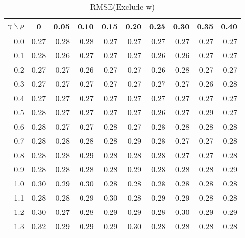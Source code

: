 \documentclass[12pt]{article}
\begin{document}
%

\begin{table}[!tbp]
\caption{RMSE(Exclude w)}
 \begin{center}
 \begin{tabular}{r|rrrrrrrrr}\hline\hline
\multicolumn{1}{c|}{$\gamma\backslash\rho$}&\multicolumn{1}{c}{0}&\multicolumn{1}{c}{0.05}&\multicolumn{1}{c}{0.10}&\multicolumn{1}{c}{0.15}&\multicolumn{1}{c}{0.20}&\multicolumn{1}{c}{0.25}&\multicolumn{1}{c}{0.30}&\multicolumn{1}{c}{0.35}&\multicolumn{1}{c}{0.40}\tabularnewline
\hline

0.0&0.27&0.28&0.28&0.27&0.27&0.27&0.27&0.27&0.27\tabularnewline
0.1&0.28&0.26&0.27&0.27&0.27&0.26&0.26&0.27&0.27\tabularnewline
0.2&0.27&0.27&0.26&0.27&0.27&0.26&0.28&0.27&0.27\tabularnewline
0.3&0.27&0.27&0.27&0.27&0.27&0.27&0.27&0.26&0.28\tabularnewline
0.4&0.27&0.27&0.27&0.27&0.27&0.27&0.27&0.27&0.27\tabularnewline
0.5&0.28&0.27&0.27&0.27&0.27&0.26&0.27&0.29&0.27\tabularnewline
0.6&0.28&0.27&0.27&0.28&0.27&0.28&0.28&0.28&0.28\tabularnewline
0.7&0.28&0.28&0.28&0.28&0.29&0.28&0.27&0.27&0.28\tabularnewline
0.8&0.28&0.28&0.29&0.28&0.28&0.28&0.27&0.27&0.28\tabularnewline
0.9&0.28&0.28&0.28&0.28&0.29&0.28&0.28&0.28&0.29\tabularnewline
1.0&0.30&0.29&0.30&0.28&0.28&0.28&0.28&0.28&0.28\tabularnewline
1.1&0.28&0.28&0.29&0.30&0.28&0.29&0.29&0.28&0.28\tabularnewline
1.2&0.30&0.27&0.28&0.29&0.29&0.28&0.30&0.29&0.29\tabularnewline
1.3&0.32&0.29&0.29&0.29&0.30&0.28&0.28&0.28&0.28\tabularnewline



\hline
\end{tabular}

\end{center}

\end{table}
\end{document}
